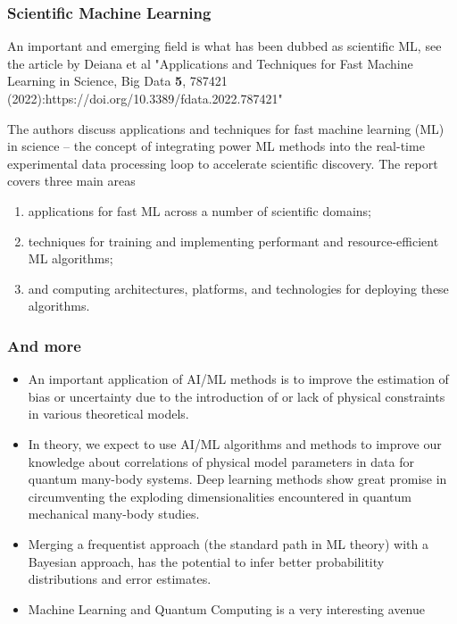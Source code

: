 \documentclass{beamer}
\begin{document}
\begin{frame}
\frametitle{Scientific Machine Learning}

An important and emerging field is what has been dubbed as scientific ML, see the article by Deiana et al "Applications and Techniques for Fast Machine Learning in Science, Big Data \textbf{5}, 787421 (2022):https://doi.org/10.3389/fdata.2022.787421"

\begin{block}{}
The authors discuss applications and techniques for fast machine
learning (ML) in science -- the concept of integrating power ML
methods into the real-time experimental data processing loop to
accelerate scientific discovery. The report covers three main areas

\begin{enumerate}
\item applications for fast ML across a number of scientific domains;

\item techniques for training and implementing performant and resource-efficient ML algorithms;

\item and computing architectures, platforms, and technologies for deploying these algorithms.
\end{enumerate}

\noindent
\end{block}
\end{frame}

\begin{frame}
\frametitle{And more}

\begin{block}{}
\begin{itemize}
\item An important application of AI/ML methods is to improve the estimation of bias or uncertainty due to the introduction of or lack of physical constraints in various theoretical models.

\item In theory, we expect to use AI/ML algorithms and methods to improve our knowledge about  correlations of physical model parameters in data for quantum many-body systems. Deep learning methods show great promise in circumventing the exploding dimensionalities encountered in quantum mechanical many-body studies. 

\item Merging a frequentist approach (the standard path in ML theory) with a Bayesian approach, has the potential to infer better probabilitity distributions and error estimates. 

\item Machine Learning and Quantum Computing is a very interesting avenue
\end{itemize}

\noindent
\end{block}
\end{frame}
\end{document}
